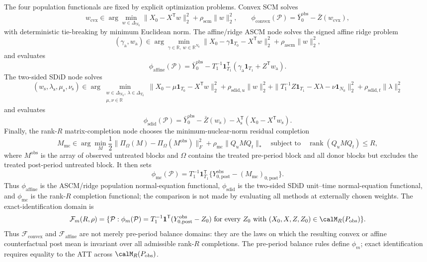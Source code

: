 \documentclass[11pt]{article}
\newcommand{\one}{\mathbf{1}}
\newcommand{\transpose}{\mathsf{T}}
\newcommand{\calF}{\mathcal{F}}
\newcommand{\R}{\mathbb{R}}
\theoremstyle{definition}
\theoremstyle{plain}
\theoremstyle{remark}
\begin{document}
The four population functionals are fixed by explicit optimization problems. Convex SCM solves
\[
w_{\mathrm{cvx}}\in\arg\min_{w\in\Delta_{N_0}}
\|X_0-X^\transpose w\|_2^2+\rho_{\mathrm{scm}}\|w\|_2^2,\qquad
\phi_{\mathrm{convex}}(\mathcal P)=\bar Y^{\mathrm{obs}}_0-\bar Z(w_{\mathrm{cvx}}),
\]
with deterministic tie-breaking by minimum Euclidean norm. The affine/ridge ASCM node solves the signed affine ridge problem
\[
(\gamma_{\mathrm{a}},w_{\mathrm{a}})\in\arg\min_{\gamma\in\R,\ w\in\R^{N_0}}
\|X_0-\gamma\one_{T_0}-X^\transpose w\|_2^2+\rho_{\mathrm{ascm}}\|w\|_2^2,
\]
and evaluates
\[
\phi_{\mathrm{affine}}(\mathcal P)
=\bar Y^{\mathrm{obs}}_0
-T_1^{-1}\one_{T_1}^\transpose(\gamma_{\mathrm{a}}\one_{T_1}+Z^\transpose w_{\mathrm{a}}).
\]
The two-sided SDiD node solves
\[
(w_{\mathrm{s}},\lambda_{\mathrm{s}},\mu_{\mathrm{s}},\nu_{\mathrm{s}})
\in\arg\min_{\substack{w\in\Delta_{N_0},\ \lambda\in\Delta_{T_0}\\ \mu,\nu\in\R}}
\|X_0-\mu\one_{T_0}-X^\transpose w\|_2^2+\rho_{\mathrm{sdid},u}\|w\|_2^2
+\|T_1^{-1}Z\one_{T_1}-X\lambda-\nu\one_{N_0}\|_2^2
+\rho_{\mathrm{sdid},t}\|\lambda\|_2^2
\]
and evaluates
\[
\phi_{\mathrm{sdid}}(\mathcal P)
=\bar Y^{\mathrm{obs}}_0-\bar Z(w_{\mathrm{s}})
-\lambda_{\mathrm{s}}^\transpose(X_0-X^\transpose w_{\mathrm{s}}).
\]
Finally, the rank-\(R\) matrix-completion node chooses the minimum-nuclear-norm residual completion
\[
M_{\mathrm{mc}}\in\arg\min_{M}
\frac12\|\Pi_{\Omega}(M)-\Pi_{\Omega}(M^{\mathrm{obs}})\|_F^2
+\rho_{\mathrm{mc}}\|Q_uMQ_t\|_*
\quad\text{subject to}\quad \operatorname{rank}(Q_uMQ_t)\le R,
\]
where \(M^{\mathrm{obs}}\) is the array of observed untreated blocks and \(\Omega\) contains the treated pre-period block and all donor blocks but excludes the treated post-period untreated block. It then sets
\[
\phi_{\mathrm{mc}}(\mathcal P)=
T_1^{-1}\one_{T_1}^\transpose
\{Y^{\mathrm{obs}}_{0,\mathrm{post}}-(M_{\mathrm{mc}})_{0,\mathrm{post}}\}.
\]
Thus \(\phi_{\mathrm{affine}}\) is the ASCM/ridge population normal-equation functional, \(\phi_{\mathrm{sdid}}\) is the two-sided SDiD unit--time normal-equation functional, and \(\phi_{\mathrm{mc}}\) is the rank-\(R\) completion functional; the comparison is not made by evaluating all methods at externally chosen weights. The exact-identification domain is
\[
\calF_m(R,\rho)
=\{\mathcal P:\phi_m(\mathcal P)=T_1^{-1}\one^\transpose(Y^{\mathrm{obs}}_{0,\mathrm{post}}-Z_0)
\text{ for every } Z_0 \text{ with } (X_0,X,Z,Z_0)\in\calM_R(P_{\mathrm{obs}})\}.
\]
Thus \(\calF_{\mathrm{convex}}\) and \(\calF_{\mathrm{affine}}\) are not merely pre-period balance domains: they are the laws on which the resulting convex or affine counterfactual post mean is invariant over all admissible rank-\(R\) completions. The pre-period balance rules define \(\phi_m\); exact identification requires equality to the ATT across \(\calM_R(P_{\mathrm{obs}})\).
\end{document}
